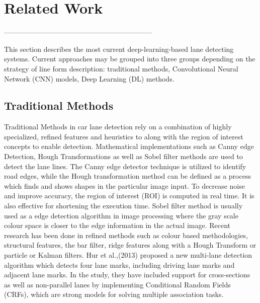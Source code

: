 
\chapter{Related Work} %

\label{Chapter3} %



---------------------------------------------------------------

This section describes the most current deep-learning-based lane detecting systems. Current approaches may be grouped into three groups depending on the strategy of line form description: traditional methods, Convolutional Neural Network (CNN) models, Deep Learning (DL) methods.


\section{Traditional Methods}

Traditional Methods in car lane detection rely on a combination of highly specialized, refined features and heuristics to along with the region of interest concepts to enable detection.\cite{neven_towards_2018} Mathematical implementations such as Canny edge Detection, Hough Transformations as well as Sobel filter methods are used to detect the lane lines. The Canny edge detector technique is utilized to identify road edges, while the Hough transformation method can be defined as a process which finds and shows shapes in the particular image input.\cite{wang_lanenet_2018} To decrease noise and improve accuracy, the region of interest (ROI) is computed in real time. It is also effective for shortening the execution time.  Sobel filter method is usually used as a edge detection algorithm in image processing where the gray scale colour space is closer to the edge information in the actual image.\cite{fong_real-time_2020}\cite{kamci_lane_2019} Recent research has been done in refined methods such as colour based methodologies\cite{1505186}, structural features\cite{neven2017fast}, the bar filter\cite{teng2010}, ridge features\cite{lopez2010} along with a Hough Transform\cite{liu2010}\cite{5548087}\cite{assidiq_real_2008} or particle or Kalman filters\cite{4459093}\cite{danescu2009}\cite{teng2010}. 
Hur et al.,(2013)\cite{hur_multi-lane_2013} proposed a new multi-lane detection algorithm which detects four lane marks, including driving lane marks and adjacent lane marks. In the study, they have included support for cross-sections as well as non-parallel lanes by implementing Conditional Random Fields (CRFs), which are strong models for solving multiple association tasks. 

